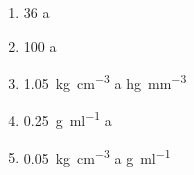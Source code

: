 \begin{exercise}
    \phantom{a}
    \begin{enumerate}[label=\letraminuscula]
        \item \qty{36}{\mps} a \unit{\kmph}
        \item \qty{100}{\kmph} a \unit{\mps}
        \item \qty{1.05}{\kilo\g\per\cubic\centi\metre} a \unit{\hecto\g\per\cubic\milli\metre}
        \item \qty{0.25}{\g\per\milli\litre} a \unit{\kilo\g\per\cubic
        \metre}
        \item \qty{0.05}{\kilo\g\per\cubic\centi\metre} a \unit{\g\per\milli\litre}
    \end{enumerate}
\end{exercise}


